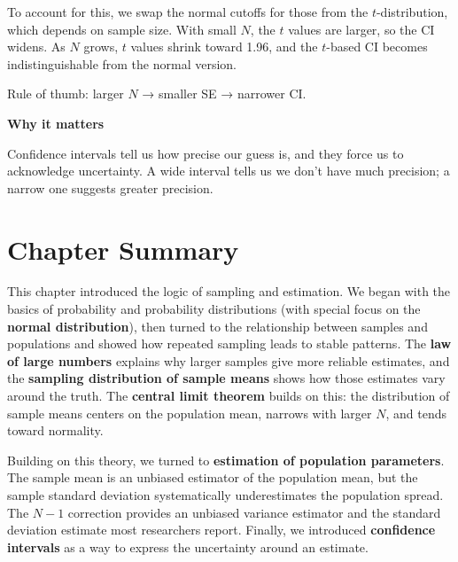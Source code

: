 \documentclass[
  letterpaper,
  DIV=11,
  numbers=noendperiod]{scrreprt}
\begin{document}
To account for this, we swap the normal cutoffs for those from the
\(t\)-distribution, which depends on sample size. With small \(N\), the
\(t\) values are larger, so the CI widens. As \(N\) grows, \(t\) values
shrink toward 1.96, and the \(t\)-based CI becomes indistinguishable
from the normal version.

\begin{tcolorbox}[enhanced jigsaw, breakable, colback=white, opacitybacktitle=0.6, coltitle=black, toprule=.15mm, bottomtitle=1mm, leftrule=.75mm, arc=.35mm, title=\textcolor{quarto-callout-tip-color}{\faLightbulb}\hspace{0.5em}{Tip}, opacityback=0, colframe=quarto-callout-tip-color-frame, left=2mm, titlerule=0mm, toptitle=1mm, colbacktitle=quarto-callout-tip-color!10!white, rightrule=.15mm, bottomrule=.15mm]

Rule of thumb: larger \(N\) → smaller SE → narrower CI.

\end{tcolorbox}

\textbf{Why it matters}

Confidence intervals tell us how precise our guess is, and they force us
to acknowledge uncertainty. A wide interval tells us we don't have much
precision; a narrow one suggests greater precision.

\section{Chapter Summary}\label{chapter-summary}

This chapter introduced the logic of sampling and estimation. We began
with the basics of probability and probability distributions (with
special focus on the \textbf{normal distribution}), then turned to the
relationship between samples and populations and showed how repeated
sampling leads to stable patterns. The \textbf{law of large numbers}
explains why larger samples give more reliable estimates, and the
\textbf{sampling distribution of sample means} shows how those estimates
vary around the truth. The \textbf{central limit theorem} builds on
this: the distribution of sample means centers on the population mean,
narrows with larger \(N\), and tends toward normality.

Building on this theory, we turned to \textbf{estimation of population
parameters}. The sample mean is an unbiased estimator of the population
mean, but the sample standard deviation systematically underestimates
the population spread. The \(N-1\) correction provides an unbiased
variance estimator and the standard deviation estimate most researchers
report. Finally, we introduced \textbf{confidence intervals} as a way to
express the uncertainty around an estimate.
\end{document}
